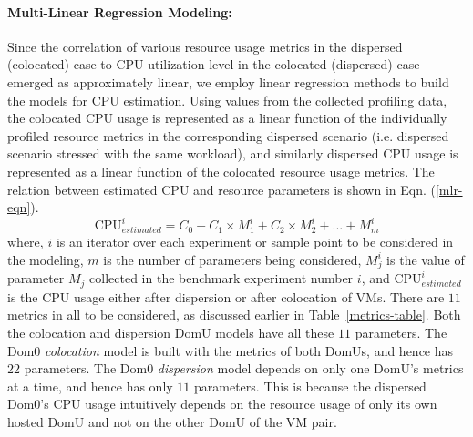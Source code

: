 \paragraph{Multi-Linear Regression Modeling: }
Since the correlation of various resource usage metrics 
in the dispersed (colocated)
case to CPU utilization level in the colocated (dispersed) 
case emerged as approximately linear, we employ 
linear regression methods to build the models for CPU estimation.
Using values from the collected profiling data,
the colocated CPU usage is represented as 
a linear function of the individually profiled resource metrics
in the corresponding dispersed scenario (i.e. dispersed scenario
stressed with the same workload),
and similarly dispersed CPU usage is represented as a linear function of 
the colocated resource usage metrics.
The relation between estimated CPU and resource parameters is shown
in Eqn. (\ref{mlr-eqn}).
\begin{equation}
\mbox{CPU}^{i}_{estimated} = C_{0} + C_{1} \times M^{i}_{1} + C_{2} \times M^{i}_{2} + ... + M^{i}_{m}
\label{mlr-eqn}
\end{equation}
where, $i$ is an iterator over each experiment or sample point
to be considered in the modeling, $m$ is
the number of parameters being considered, $M^{i}_{j}$ is
the value of parameter $M_{j}$ collected in the benchmark experiment number
$i$, and $\mbox{CPU}^{i}_{estimated}$ is the CPU usage 
either after dispersion or after colocation of VMs.
There are $11$ metrics in all to be considered, as discussed 
earlier in Table~\ref{metrics-table}. 
Both the colocation and dispersion DomU models have all these $11$ parameters.
The Dom0 \textit{colocation} model is built
with the metrics of both DomUs, and hence has $22$ parameters. 
The Dom0 \textit{dispersion} model 
depends on only one DomU's metrics at a time, and hence has only $11$
parameters.
This is because the dispersed Dom0's CPU usage intuitively
depends on the resource usage of only its own hosted DomU and 
not on the other DomU of the VM pair.

